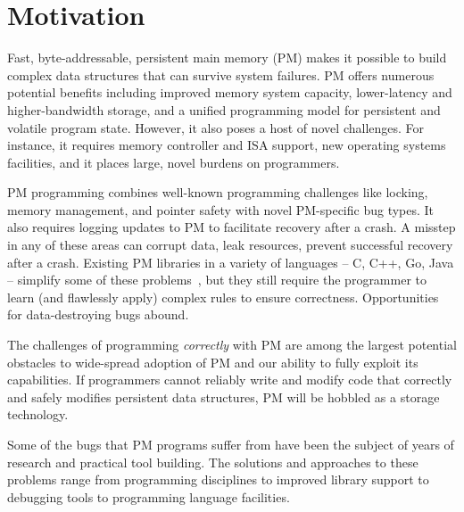 \documentclass[pageno]{jpaper}
\theoremstyle{invar}
\theoremstyle{goal}
\begin{document}
\title{\papertitle}

\author{Morteza Hoseinzadeh and Steven Swanson\\
University of California, San Diego} 
\date{}

\maketitle

\section{Motivation}
\label{sec:motivation}

Fast, byte-addressable, persistent main memory (PM) makes it possible to build
complex data structures that can survive system failures.  PM offers
numerous potential benefits including improved memory system capacity,
lower-latency and higher-bandwidth storage, and a unified programming model for
persistent and volatile program state.  However, it also poses a host of novel
challenges.  For instance, it requires memory controller and ISA support, new operating
systems facilities, and it places large, novel burdens on programmers.

PM programming combines well-known programming challenges like locking, memory
management, and pointer safety with novel PM-specific bug types.  It also
requires logging updates to PM to facilitate recovery after a crash.  A misstep
in any of these areas can corrupt data, leak resources, prevent successful
recovery after a crash.  Existing PM libraries in a variety of languages -- C,
C++, Go, Java -- simplify some of these
problems~\cite{pmdk,nvheaps,oracle-nvm-direct,atlas,mnemosyne}, but they still
require the programmer to learn (and flawlessly apply) complex rules to ensure
correctness.  Opportunities for data-destroying bugs abound.

The challenges of programming \emph{correctly} with PM are among the largest
potential obstacles to wide-spread adoption of PM and our ability to fully
exploit its capabilities.  If programmers cannot reliably write and modify code
that correctly and safely modifies persistent data structures, PM will be
hobbled as a storage technology.

Some of the bugs that PM programs suffer from have been the subject of
years of research and practical tool building.  The solutions and approaches to
these problems range from programming disciplines to improved library support
to debugging tools to programming language facilities.
\end{document}
